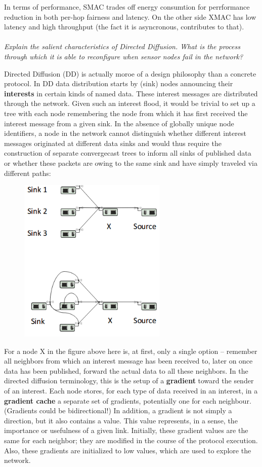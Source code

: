 \documentclass[12pt]{article}
\newcommand*\circled[1]{\tikz[baseline=(char.base)]{
		\node[shape=circle,draw,inner sep=0pt] (char) {#1};}}
\begin{document}
In terms of performance, SMAC trades off energy consumtion for perrformance
reduction in both per-hop fairness and latency. On the other side XMAC has low
latency and high throughput (the fact it is asyncronous, contributes to that).
\\
\\
\textit{\circled{8.} Explain the salient characteristics of Directed Diffusion.
What is the process through which it is able to reconfigure when sensor nodes
fail in the network?}

Directed Diffusion (DD) is actually moroe of a design philosophy than
a concrete protocol. In DD data distribution starts by (sink) nodes announcing
their \textbf{interests} in certain kinds of named data. These interest
messages are distributed through the network. Given such an interest flood, it
would be trivial to set up a tree with each node remembering the node from
which it has first received the interest message from a given sink. In the
absence of globally unique node identifiers, a node in the network cannot
distinguish whether different interest messages originated at different data
sinks and would thus require the construction of separate convergecast trees to
inform all sinks of published data or whether these packets are owing to the
same sink and have simply traveled via different paths:
\begin{figure}[H]
    \centering
    \includegraphics[width=200pt]{two_phase_pull.png}
\end{figure}
For a node X in the figure above here is, at first, only a single option --
remember all neighbors from which an interest message has been received to,
later on once data has been published, forward the actual data to all these
neighbors. In the directed diffusion terminology, this is the setup of
a \textbf{gradient} toward the sender of an interest. Each node stores, for
each type of data received in an interest, in a \textbf{gradient cache}
a separate set of gradients, potentially one for each neighbour. (Gradients
could be bidirectional!) In addition, a gradient is not simply a direction, but
it also contains a value. This value represents, in a sense, the importance or
usefulness of a given link. Initially, these gradient values are the same for
each neighbor; they are modified in the course of the protocol execution. Also,
these gradients are initialized to low values, which are used to explore the
network.
\end{document}
